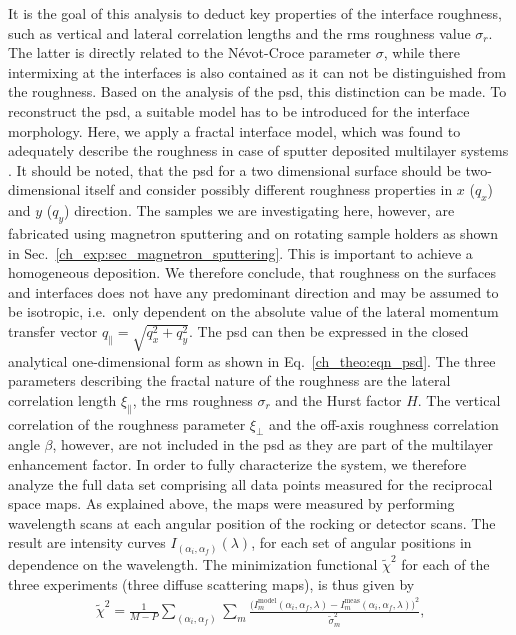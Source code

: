 It is the goal of this analysis to deduct key properties of the interface roughness, such as vertical and lateral correlation lengths and the \gls{rms} roughness value $\sigma_r$. The latter is directly related to the N\'{e}vot-Croce parameter $\sigma$, while there intermixing at the interfaces is also contained as it can not be distinguished from the roughness. Based on the analysis of the \gls{psd}, this distinction can be made. To reconstruct the \gls{psd}, a suitable model has to be introduced for the interface morphology. Here, we apply a fractal interface model, which was found to adequately describe the roughness in case of sputter deposited multilayer systems \cite{de_boer_x-ray_1995, de_boer_x-ray_1996, sinha_x-ray_1988}. It should be noted, that the \gls{psd} for a two dimensional surface should be two-dimensional itself and consider possibly different roughness properties in $x$ ($q_x$) and $y$ ($q_y$) direction. The samples we are investigating here, however, are fabricated using magnetron sputtering and on rotating sample holders as shown in Sec.~\ref{ch_exp:sec_magnetron_sputtering}. This is important to achieve a homogeneous deposition. We therefore conclude, that roughness on the surfaces and interfaces does not have any predominant direction and may be assumed to be isotropic, i.e.~only dependent on the absolute value of the lateral momentum transfer vector $q_\parallel = \sqrt{q_x^2+q_y^2}$. The \gls{psd} can then be expressed in the closed analytical one-dimensional form as shown in Eq.~\eqref{ch_theo:eqn_psd}. The three parameters describing the fractal nature of the roughness are the lateral correlation length $\xi_\parallel$, the \gls{rms} roughness $\sigma_r$ and the Hurst factor $H$. The vertical correlation of the roughness parameter $\xi_\perp$ and the off-axis roughness correlation angle $\beta$, however, are not included in the \gls{psd} as they are part of the multilayer enhancement factor. In order to fully characterize the system, we therefore analyze the full data set comprising all data points measured for the reciprocal space maps. As explained above, the maps were measured by performing wavelength scans at each angular position of the rocking or detector scans. The result are intensity curves $I_{(\alpha_i, \alpha_f)}(\lambda)$, for each set of angular positions in dependence on the wavelength. The minimization functional $\tilde{\chi}^2$ for each of the three experiments (three diffuse scattering maps), is thus given by
\begin{align}
 \tilde{\chi}^2 = \frac{1}{M-P} \sum\limits_{(\alpha_i, \alpha_f)} \sum\limits_{m} \frac{\big(I_m^\text{model}(\alpha_i, \alpha_f, \lambda)
- I_m^\text{meas}(\alpha_i, \alpha_f, \lambda)\big)^2}{\tilde{\sigma}_m^2} \text{,} \label{ch_diff:eqn_chi_diffuse}
\end{align}
